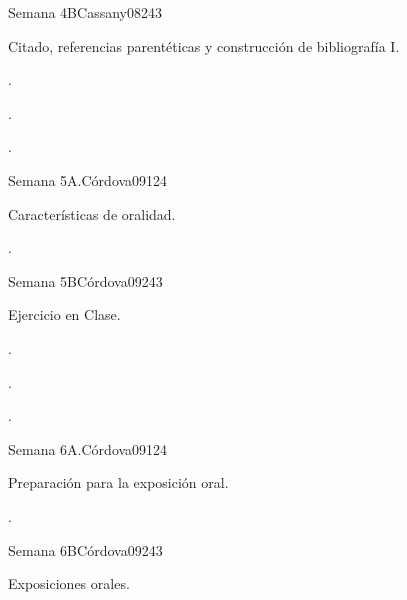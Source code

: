 \begin{syllabus}
\begin{unit}{Semana 4B}{}{Cassany08}{24}{3}
   \begin{topics}
      \item Citado, referencias parentéticas y construcción de bibliografía I.
   \end{topics}

   \begin{learningoutcomes}
      \item . 
      \item .
      \item . 
      \end{learningoutcomes}
\end{unit}

\begin{unit}{Semana 5A.}{}{Córdova09}{12}{4}
   \begin{topics}
      \item Características de oralidad.
   \end{topics}
   \begin{learningoutcomes}
      \item . 
   \end{learningoutcomes}
\end{unit}

\begin{unit}{Semana 5B}{}{Córdova09}{24}{3}
   \begin{topics}
      \item Ejercicio en Clase.
   \end{topics}

   \begin{learningoutcomes}
      \item . 
      \item .
      \item . 
      \end{learningoutcomes}
\end{unit}

\begin{unit}{Semana 6A.}{}{Córdova09}{12}{4}
   \begin{topics}
      \item Preparación para la exposición oral. 
   \end{topics}
   \begin{learningoutcomes}
      \item . 
   \end{learningoutcomes}
\end{unit}

\begin{unit}{Semana 6B}{}{Córdova09}{24}{3}
   \begin{topics}
      \item Exposiciones orales.
   \end{topics}


\end{unit}
\end{syllabus}
